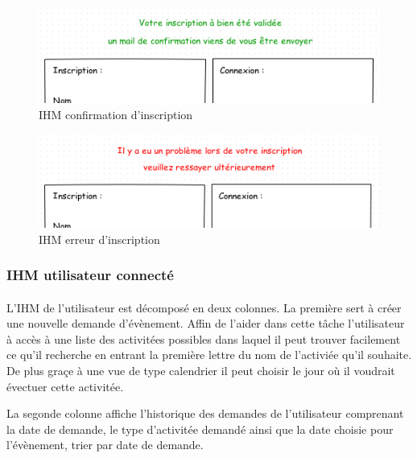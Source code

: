 \documentclass[a4paper,11pt]{article}
\begin{document}
\begin{figure}[H]
  \begin{center}
    \includegraphics[width=15cm]{../../IHM/IHM_connection_utilisateur_conf_ins_z.png}
    \caption{IHM confirmation d'inscription}
  \end{center}
\end{figure}

\begin{figure}[H]
  \begin{center}
    \includegraphics[width=15cm]{../../IHM/IHM_connection_utilisateur_erreur_ins_z.png}
    \caption{IHM erreur d'inscription}
  \end{center}
\end{figure}

\pagebreak
\subsubsection{IHM utilisateur connecté}

\paragraph{}
L'IHM de l'utilisateur est décomposé en deux colonnes. La première sert à créer une nouvelle demande d'évènement. Affin de l'aider dans cette tâche l'utilisateur à accès à une liste des activitées possibles dans laquel il peut trouver facilement ce qu'il recherche en entrant la première lettre du nom de l'activiée qu'il souhaite. De plus graçe à une vue de type calendrier il peut choisir le jour où il voudrait évectuer cette activitée.

La segonde colonne affiche l'historique des demandes de l'utilisateur comprenant la date de demande, le type d'activitée demandé ainsi que la date choisie pour l'évènement, trier par date de demande.
\end{document}
